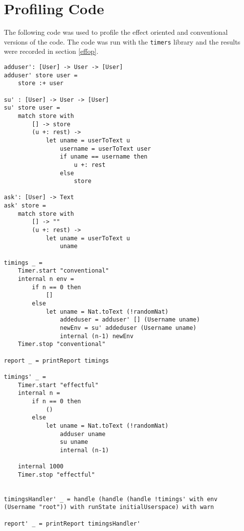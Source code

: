 \documentclass[logo,bsc,singlespacing,parskip]{infthesis}
\begin{document}
\chapter{Profiling Code}

The following code was used to profile the effect oriented and conventional
versions of the code. The code was run with the \texttt{timers} library
\cite{timers} and the results were recorded in section \ref{effop}.

\begin{lstlisting}[language=unison]
adduser': [User] -> User -> [User]
adduser' store user = 
    store :+ user

su' : [User] -> User -> [User]
su' store user = 
    match store with
        [] -> store
        (u +: rest) -> 
            let uname = userToText u
                username = userToText user
                if uname == username then 
                    u +: rest 
                else 
                    store

ask': [User] -> Text
ask' store = 
    match store with 
        [] -> ""
        (u +: rest) -> 
            let uname = userToText u
                uname

timings _ = 
    Timer.start "conventional"
    internal n env = 
        if n == 0 then 
            []
        else 
            let uname = Nat.toText (!randomNat)
                addeduser = adduser' [] (Username uname)
                newEnv = su' addeduser (Username uname)
                internal (n-1) newEnv
    Timer.stop "conventional"

report _ = printReport timings

timings' _ = 
    Timer.start "effectful"
    internal n = 
        if n == 0 then 
            ()
        else 
            let uname = Nat.toText (!randomNat)
                adduser uname 
                su uname
                internal (n-1)

    internal 1000
    Timer.stop "effectful"
    

timingsHandler' _ = handle (handle (handle !timings' with env (Username "root")) with runState initialUserspace) with warn

report' _ = printReport timingsHandler'
\end{lstlisting}



\end{document}
